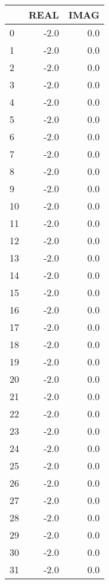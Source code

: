 \begin{tabular}{lrr}
\toprule
{} &  REAL &  IMAG \\
\midrule
0  &  -2.0 &   0.0 \\
1  &  -2.0 &   0.0 \\
2  &  -2.0 &   0.0 \\
3  &  -2.0 &   0.0 \\
4  &  -2.0 &   0.0 \\
5  &  -2.0 &   0.0 \\
6  &  -2.0 &   0.0 \\
7  &  -2.0 &   0.0 \\
8  &  -2.0 &   0.0 \\
9  &  -2.0 &   0.0 \\
10 &  -2.0 &   0.0 \\
11 &  -2.0 &   0.0 \\
12 &  -2.0 &   0.0 \\
13 &  -2.0 &   0.0 \\
14 &  -2.0 &   0.0 \\
15 &  -2.0 &   0.0 \\
16 &  -2.0 &   0.0 \\
17 &  -2.0 &   0.0 \\
18 &  -2.0 &   0.0 \\
19 &  -2.0 &   0.0 \\
20 &  -2.0 &   0.0 \\
21 &  -2.0 &   0.0 \\
22 &  -2.0 &   0.0 \\
23 &  -2.0 &   0.0 \\
24 &  -2.0 &   0.0 \\
25 &  -2.0 &   0.0 \\
26 &  -2.0 &   0.0 \\
27 &  -2.0 &   0.0 \\
28 &  -2.0 &   0.0 \\
29 &  -2.0 &   0.0 \\
30 &  -2.0 &   0.0 \\
31 &  -2.0 &   0.0 \\
\bottomrule
\end{tabular}
